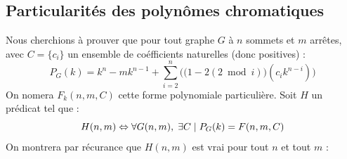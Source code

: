 \subsection{Particularités des polynômes chromatiques}
Nous cherchions à prouver que pour tout graphe $G$ à $n$ sommets et $m$ arrêtes, avec $C = \{c_i\}$ un ensemble de coéfficients naturelles (donc positives) : 
\[ P_G(k) = k^n - mk^{n-1} + \sum_{i = 2}^n \Big(\big(1 - 2(2\bmod{i})\big)(c_ik^{n-i})\Big) \]
On nomera $F_k(n,m,C)$ cette forme polynomiale particulière. Soit $H$ un prédicat tel que :
\[ H(n,m) \Leftrightarrow \forall{G(n,m)}, \hspace{1mm} \exists{C} \hspace{1mm} 
										| \hspace{1mm} P_G(k) = F(n, m, C) \]
On montrera par récurance que $H(n,m)$ est vrai pour tout $n$ et tout $m$ :

